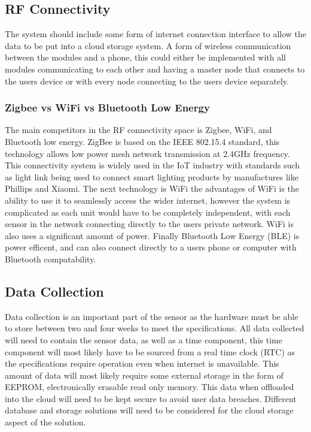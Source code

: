 \documentclass[12pt]{article}
\begin{document}
\subsection{RF Connectivity}
The system should include some form of internet connection interface to allow the data to be put 
into a cloud storage system. A form of wireless communication between the modules and a phone,
this could either be implemented with all modules communicating to each other and having a master
node that connects to the users device or with every node connecting to the users device
separately. 

\subsubsection{Zigbee vs WiFi vs Bluetooth Low Energy}
The main competitors in the RF connectivity space is Zigbee, WiFi, and Bluetooth low energy.
ZigBee is based on the IEEE 802.15.4 standard, this technology allows low power mesh network 
transmission at 2.4GHz frequency. This connectivity system is widely used in the IoT industry with
standards such as light link being used to connect smart lighting products by manufactures like
Phillips and Xiaomi. The next technology is WiFi the advantages of WiFi is the ability to use it
to seamlessly access the wider internet, however the system is complicated as each unit would have
to be completely independent, with each sensor in the network connecting directly to the users
private network. WiFi is also uses a significant amount of power. Finally Bluetooth Low Energy
(BLE) is power efficent, and can also connect directly to a users phone or computer with Bluetooth
compatability.

\subsection{Data Collection}
Data collection is an important part of the sensor as the hardware must be able to store between
two and four weeks to meet the specifications. All data collected will need to contain the sensor
data, as well as a time component, this time component will most likely have to be sourced from a
real time clock (RTC) as the specifications require operation even when internet is unavailable.
This amount of data will most likely require some external storage in the form of EEPROM,
electronically erasable read only memory. This data when offloaded into the cloud will need to be
kept secure to avoid user data breaches. Different database and storage solutions will need to be
considered for the cloud storage aspect of the solution.
\end{document}
